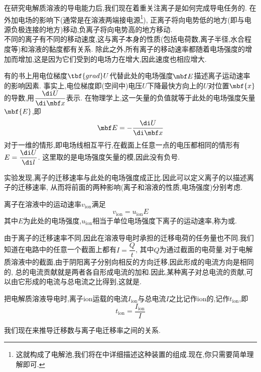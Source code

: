 \documentclass{ctexart}
\begin{document}
\indent 在研究电解质溶液的导电能力后,我们现在着重关注离子是如何完成导电任务的.%
在外加电场的影响下(通常是在溶液两端接电源\footnote{这就构成了电解池,我们将在中详细描述这种装置的组成.现在,你只需要简单理解即可.}),%
正离子将向电势低的地方(即与电源负极连接的地方)移动,负离子将向电势高的地方移动.\\
\indent 不同的离子有不同的移动速度,这与离子本身的性质(包括电荷数,离子半径,水合程度等)和溶液的黏度都有关系.%
除此之外,所有离子的移动速率都随着电场强度的增加而增加,这是因为它们受到的电场力在增大,因此速度也相应增大.
\begin{hint}
    有的书上用电位梯度$\tbf{grad }U$代替此处的电场强度$\mbf E$描述离子运动速率的影响因素.%
    事实上,电位梯度即(空间中)电压$U$下降最快方向上的$U$对位置$\mbf{x}$的导数,用$\dfrac{\di U}{\di\mbf x}$表示.%
    在物理学上,这一矢量的负值就等于此处的电场强度矢量$\mbf{E}$,即
    \[\mbf E=-\dfrac{\di U}{\di\mbf x}\]
    对于一维的情形,即电场线相互平行,在截面上任意一点的电压都相同的情形有$E=\dfrac{\di U}{\di l}$.%
    这里取的是电场强度矢量的模,因此没有负号.
\end{hint}
实验发现,离子的迁移速率与此处的电场强度成正比.因此可以定义离子的以描述离子的迁移速率,%
从而将前面的两种影响(离子和溶液的性质,电场强度)分别考虑.
\begin{definition}[6A.2.1 离子电迁移率]
    离子在溶液中的运动速率$v_{\text{ion}}$满足
    \[v_{\text{ion}}=u_{\text{ion}}E\]
    其中$E$为此处的电场强度,$u_{\text{ion}}$相当于单位电场强度下离子的运动速率,称为或.
\end{definition}
由于离子的迁移速率不同,因此在溶液导电时承担的迁移电荷的任务量也不同.我们知道在电路中的任意一个截面上都有$I=\dfrac{Q}{t}$,%
其中$Q$为通过截面的电荷量.对于电解质溶液中的截面,由于阴阳离子分别向相反的方向迁移,因此形成的电流方向是相同的,%
总的电流贡献就是两者各自形成电流的加和.因此,某种离子对总电流的贡献,可以由它形成的电流与总电流之比得到,这就是.
\begin{definition}[6A.2.2 迁移数]
    把电解质溶液导电时,离子ion运载的电流$I_{\text{ion}}$与总电流$I$之比记作ion的,记作$t_{\text{ion}}$,即
    \[t_{\text{ion}}=\dfrac{I_{\text{ion}}}{I}\]

\end{definition}
我们现在来推导迁移数与离子电迁移率之间的关系.
\end{document}
